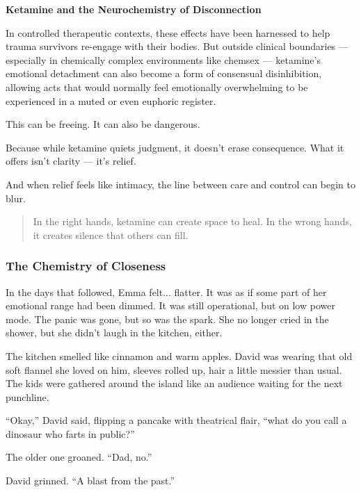\begin{TechnicalSidebar}{\textbf{Ketamine and the Neurochemistry of Disconnection}}
  \medskip
  
  In controlled therapeutic contexts, these effects have been harnessed to help trauma survivors re-engage 
  with their bodies. But outside clinical boundaries — especially in chemically complex environments like 
  chemsex — ketamine’s emotional detachment can also become a form of consensual disinhibition, allowing 
  acts that would normally feel emotionally overwhelming to be experienced in a muted or even euphoric 
  register.
  
  \medskip
  
  This can be freeing.
  It can also be dangerous.

  \medskip
  
  Because while ketamine quiets judgment, it doesn’t erase consequence. What it offers isn’t clarity 
  — it’s relief.

  \medskip
  
  And when relief feels like intimacy, the line between care and control can begin to blur.
  
  \begin{quote}
    In the right hands, ketamine can create space to heal.  
    In the wrong hands, it creates silence that others can fill.
  \end{quote}
  
\end{TechnicalSidebar}

\subsubsection{The Chemistry of Closeness}

In the days that followed, Emma felt... flatter. It was as if some part of her emotional 
range had been dimmed. It was still operational, but on low power mode. The panic was gone, but so was the 
spark. She no longer cried in the shower, but she didn’t laugh in the kitchen, either.

The kitchen smelled like cinnamon and warm apples. David was wearing that old soft flannel she loved on 
him, sleeves rolled up, hair a little messier than usual. The kids were gathered around the island like 
an audience waiting for the next punchline.

``Okay,'' David said, flipping a pancake with theatrical flair, ``what do you call a dinosaur who farts 
in public?''

The older one groaned. ``Dad, no.''

David grinned. ``A blast from the past.''

